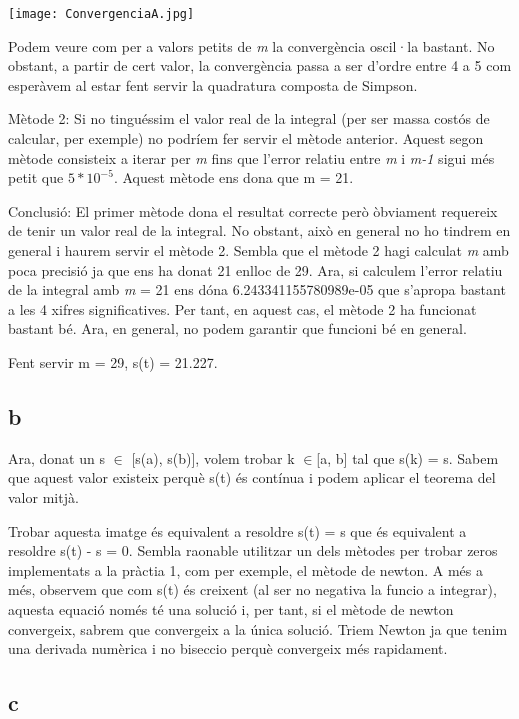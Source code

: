 \documentclass{article}
\begin{document}
\begin{center}
\texttt{[image: ConvergenciaA.jpg]}
\end{center}

Podem veure com per a valors petits de \emph{m} la convergència oscil·la bastant. No obstant, a partir de cert valor, la convergència passa a ser d'ordre entre 4 a 5 com esperàvem al estar fent servir la quadratura composta de Simpson.


Mètode 2: Si no tinguéssim el valor real de la integral (per ser massa costós de calcular, per exemple) no podríem fer servir el mètode anterior. Aquest segon mètode consisteix a iterar per \emph{m} fins que l'error relatiu entre \emph{m} i \emph{m-1} sigui més petit que $5*10^{-5}$. 
Aquest mètode ens dona que m = 21.

Conclusió: El primer mètode dona el resultat correcte però òbviament requereix de tenir un valor real de la integral. No obstant, això en general no ho tindrem en general i haurem servir el mètode 2. Sembla que el mètode 2 hagi calculat \emph{m} amb poca precisió ja que ens ha donat 21 enlloc de 29. Ara, si calculem l'error relatiu de la integral amb \emph{m} = 21 ens dóna 6.243341155780989e-05 que s'apropa bastant a les 4 xifres significatives. Per tant, en aquest cas, el mètode 2 ha funcionat bastant bé. Ara, en general, no podem garantir que funcioni bé en general.


Fent servir m = 29, s(t) = 21.227.

\subsection{b}

Ara, donat un s \( \in \) [s(a), s(b)], volem trobar k \( \in \)[a, b] tal que s(k) = s. Sabem que aquest valor existeix perquè s(t) és contínua i podem aplicar el teorema del valor mitjà. 

Trobar aquesta imatge és equivalent a resoldre s(t) = s que és equivalent a resoldre s(t) - s = 0. Sembla raonable utilitzar un dels mètodes per trobar zeros implementats a la pràctia 1, com per exemple, el mètode de newton. A més a més, observem que com s(t) és creixent (al ser no negativa la funcio a integrar), aquesta equació només té una solució i, per tant, si el mètode de newton convergeix, sabrem que convergeix a la única solució. Triem Newton ja que tenim una derivada numèrica i no biseccio perquè convergeix més rapidament.

\subsection{c}
\end{document}
